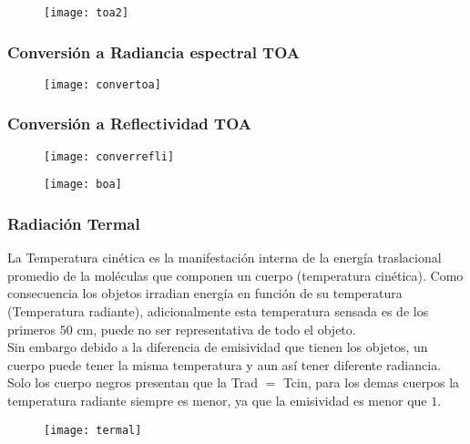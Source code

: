 \documentclass[14pt]{beamer}
\begin{document}
\begin{frame}
\scriptsize{}
  \begin{figure}
    \centering
    \texttt{[image: toa2]}
     \end{figure}
\end{frame}
\begin{frame}
\frametitle{Conversión a Radiancia espectral TOA}
\scriptsize{}
  \begin{figure}
    \centering
    \texttt{[image: convertoa]}
  \end{figure}
\end{frame}
\begin{frame}
\frametitle{Conversión a Reflectividad TOA}
\scriptsize{}
  \begin{figure}
    \centering
    \texttt{[image: converrefli]}
  \end{figure}
\end{frame}
\begin{frame}
\scriptsize{}
  \begin{figure}
    \centering
    \texttt{[image: boa]}
  \end{figure}
\end{frame}
\begin{frame}
\frametitle{Radiación Termal}
\small{La Temperatura cinética es la manifestación interna de la energía traslacional promedio de la moléculas que componen un cuerpo (temperatura cinética). Como consecuencia  los objetos irradian energía en función de su temperatura (Temperatura radiante), adicionalmente esta temperatura sensada es de los primeros $50$ cm, puede no ser representativa de todo el objeto.\\
Sin embargo debido a la diferencia de emisividad que tienen los objetos, un cuerpo puede tener la misma temperatura y aun así tener diferente radiancia. Solo los cuerpo negros presentan que la Trad $=$ Tcin, para los demas cuerpos la temperatura radiante siempre es menor, ya que la emisividad es menor que $1$.}
\begin{figure}
    \centering
    \texttt{[image: termal]}
  \end{figure}
\end{frame}
\end{document}
